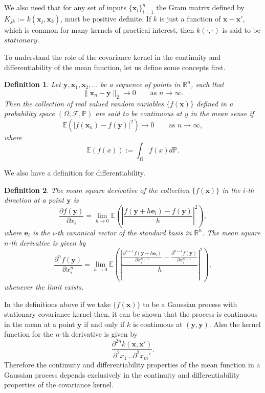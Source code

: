 \documentclass{sfuthesis}
\newtheorem{definition}{Definition}
\newcommand{\p}{\mathbb{P}}
\newcommand{\E}{\mathbb{E}} %
\newcommand{\x}{\textbf{x}}
\newcommand{\y}{\textbf{y}}
\begin{document}
We also need that for  any set of inputs $\{\x_{i}\}_{i=1}^{n}$  the Gram  matrix defined by 
$K_{jk}:=k(\x_{j},\x_{k})$, must be positive definite. If  $k$ is just a function of $\x-\x'$,
which is common for many kernels of practical interest, then $k(\cdot,\cdot)$ is said to be $\textit{stationary}$.

To understand the role of the covariance kernel in the continuity and differentiability
 of the mean function, let us
define some concepts first. 
\begin{definition}
Let $\y,\x_{1},\x_{2},\ldots$ be a sequence of points in $\mathbb{R}^{n}$, such that 
\begin{equation*}
\|\x_{n}-\y\|_{2}\rightarrow 0\qquad\text{as }n\rightarrow\infty.
\end{equation*}
Then the collection of real valued random variables $\{f(\x)\}$ defined in a probability space
$(\Omega,\mathscr{F},\p)$ are said to be continuous at $y$ in the mean sense if 
\begin{equation*}
\E(|f(\x_{n})-f(\y)|^{2})\rightarrow 0\qquad\text{as } n\rightarrow\infty,
\end{equation*}
where
\begin{equation*}
\E(f(x)):=\int_{\Omega}f(x)d\p.
\end{equation*}
\end{definition}
We also have a definition for differentiability.
\begin{definition}
The mean square derivative of the  collection $\{f(\x)\}$  in the $i$-th direction  at a point $\y$ is
\begin{equation*}
\frac{\partial f(\y)}{\partial x_{i}}=
\lim_{h\rightarrow 0}\E\left(\left|\frac{f(\y+h\textbf{e}_{i})-f(\y)}{h}\right|^{2}\right),
\end{equation*}
where $\textbf{e}_{i}$ is the $i$-th canonical vector of the standard basis in $\mathbb{R}^{n}$.
The mean square $n$-th derivative is given by 
\begin{equation*}
\frac{\partial^{n} f(\y)}{\partial x_{i}^{n}}=
\lim_{h\rightarrow 0}\E\left(\left|\frac{\frac{\partial^{n-1}f(\y+h\textbf{e}_{i})}{\partial x_{i}^{n-1}}-
\frac{\partial^{n-1}f(\y)}{\partial x_{i}^{n-1}}}{h}\right|^{2}\right),
\end{equation*}
whenever the limit exists.
\end{definition}


In the definitions above if we take $\{f(\x)\}$ to be a Gaussian process with stationary covariance kernel then, it can be shown that 
the process is continuous in the mean at a point $\y$ if and only if $k$ is continuous at $(\y,\y)$. 
Also the kernel function for the $n$-th derivative is given by \cite{adlergeometry}
\begin{equation*}
\frac{\partial^{2n}k(\x,\x')}{\partial^{2}x_{1}\ldots\partial^{2}x_{m}'}.
\end{equation*}
Therefore the continuity and differentiability properties of the mean function in a Gaussian process
depends exclusively in the continuity and differentiability properties of the covariance kernel.
\newline
\end{document}
